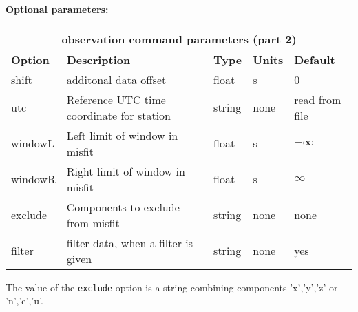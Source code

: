 \documentclass[11pt]{report}
\begin{document}
{\bf Optional parameters:}\\
%
\begin{center}
\begin{tabular}{|l|p{8cm}|l|l|l|} \hline
\multicolumn{5}{|c|}{\bf observation command parameters (part 2)}\\ \hline
\bf{Option} & \bf{Description} & \bf{Type} & \bf{Units} & \bf{Default} \\ \hline \hline
shift & additonal data offset & float & s  & 0 \\ \hline
utc & Reference UTC time coordinate for station & string & none & read from file \\ \hline
windowL & Left limit of window in misfit & float & s & $-\infty$  \\ \hline
windowR & Right limit of window in misfit & float & s & $\infty$  \\ \hline
exclude & Components to exclude from misfit & string & none & none  \\ \hline
filter & filter data, when a filter is given & string & none & yes \\ \hline
\end{tabular}
\end{center}
The value of the \verb+exclude+ option is a string combining components 'x','y','z' or 'n','e','u'.
\end{document}
